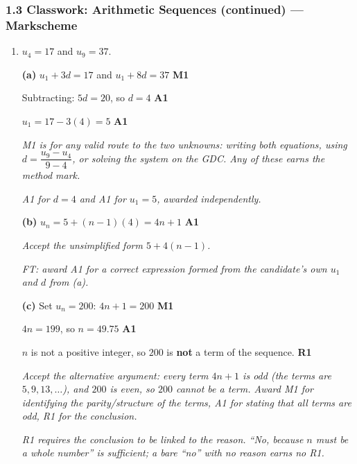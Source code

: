 \documentclass[12pt, twoside]{article}
\begin{document}
\subsubsection*{1.3 Classwork: Arithmetic Sequences (continued) --- Markscheme}

\begin{enumerate}[itemsep=0.3cm]


\item[1.] [Maximum mark: 7]

$u_{4} = 17$ and $u_{9} = 37$.

\medskip

\textbf{(a)} $u_{1} + 3d = 17$ \quad and \quad $u_{1} + 8d = 37$
\hfill \textbf{M1}

Subtracting: $5d = 20$, so $d = 4$ \hfill \textbf{A1}

$u_{1} = 17 - 3(4) = 5$ \hfill \textbf{A1}

\emph{M1 is for any valid route to the two unknowns: writing both
equations, using $d = \dfrac{u_{9} - u_{4}}{9 - 4}$, or solving the
system on the GDC. Any of these earns the method mark.}

\emph{A1 for $d = 4$ and A1 for $u_{1} = 5$, awarded independently.}

\medskip

\textbf{(b)} $u_{n} = 5 + (n - 1)(4) = 4n + 1$ \hfill \textbf{A1}

\emph{Accept the unsimplified form $5 + 4(n-1)$.}

\emph{FT: award A1 for a correct expression formed from the
candidate's own $u_{1}$ and $d$ from (a).}

\medskip

\textbf{(c)} Set $u_{n} = 200$: \quad $4n + 1 = 200$
\hfill \textbf{M1}

$4n = 199$, so $n = 49.75$ \hfill \textbf{A1}

$n$ is not a positive integer, so $200$ is \textbf{not} a term of the
sequence. \hfill \textbf{R1}

\emph{Accept the alternative argument: every term $4n + 1$ is odd
(the terms are $5, 9, 13, \ldots$), and $200$ is even, so $200$
cannot be a term. Award M1 for identifying the parity/structure of
the terms, A1 for stating that all terms are odd, R1 for the
conclusion.}

\emph{R1 requires the conclusion to be linked to the reason. ``No,
because $n$ must be a whole number'' is sufficient; a bare ``no'' with
no reason earns no R1.}


\end{enumerate}
\end{document}

